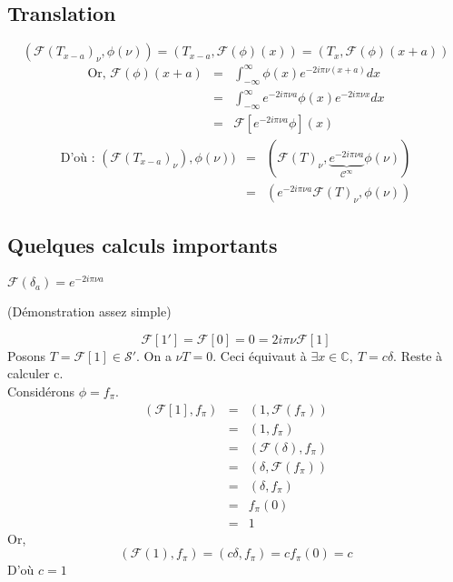 \documentclass{article}
\begin{document}
\subsection{Translation}

\begin{dem}
\[(\mathcal{F}(T_{x-a})_{\nu},\phi(\nu)) =(T_{x-a},\mathcal{F}(\phi)(x)) = (T_x,\mathcal{F}(\phi)(x+a)) \]
\begin{eqnarray*}
\text{Or, } \mathcal{F}(\phi)(x+a) &=& \int_{-\infty}^{\infty} \phi(x) e^{-2i\pi\nu(x+a)} dx \\
				   &=& \int_{-\infty}^{\infty} e^{-2i\pi\nu a} \phi(x) e^{-2i\pi\nu x} dx \\
				   &=& \mathcal{F}[e^{-2i\pi\nu a}\phi](x)
\end{eqnarray*}
\begin{eqnarray*}
\text{D'où : } (\mathcal{F}(T_{x-a})_{\nu}),\phi(\nu))&=& (\mathcal{F}(T)_{\nu},\underbrace{e^{-2i\pi\nu a}}_{\mathcal{C}^{\infty}}\phi(\nu)) \\
						      &=& (e^{-2i\pi\nu a} \mathcal{F}(T)_{\nu}, \phi(\nu))
\end{eqnarray*}
\end{dem}

\subsection{Quelques calculs importants}

\begin{rap}
$\mathcal{F}(\delta_a)=e^{-2i\pi\nu a}$
\end{rap}
(Démonstration assez simple)

\bigskip
{}

\begin{dem}
\[\mathcal{F}[1']=\mathcal{F}[0]=0=2i\pi\nu \mathcal{F}[1]\]
Posons $T=\mathcal{F}[1]\in\mathcal{S}'$. On a $\nu T=0$. Ceci équivaut à $\exists x\in\mathbb{C},\ T=c\delta$. Reste à calculer c. \\
Considérons $\phi=f_{\pi}$. 
\begin{eqnarray*}
(\mathcal{F}[1],f_{\pi})&=& (1,\mathcal{F}(f_{\pi})) \\
		        &=& (1,f_{\pi}) \\
			&=& (\mathcal{F}(\delta),f_{\pi}) \\
			&=& (\delta,\mathcal{F}(f_{\pi})) \\
			&=& (\delta,f_{\pi}) \\
			&=& f_{\pi}(0) \\
			&=& 1
\end{eqnarray*}
Or, \[(\mathcal{F}(1),f_{\pi})=(c\delta,f_{\pi})=cf_{\pi}(0)=c\]
D'où $c=1$
\end{dem}
\end{document}

